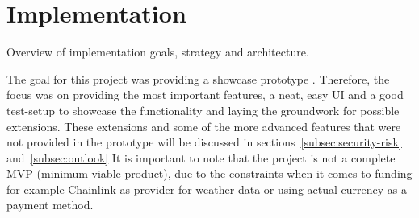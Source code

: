 \documentclass[11pt,a4paper]{article}
\begin{document}
    \section{Implementation}\label{sec:implementation}
    Overview of implementation goals, strategy and architecture.

    The goal for this project was providing a showcase prototype .
    Therefore, the focus was on providing the most important features, a neat, easy UI and a good test-setup to showcase the functionality and laying the groundwork for possible extensions.
    These extensions and some of the more advanced features that were not provided in the prototype will be discussed in sections~\ref{subsec:security-risk} and~\ref{subsec:outlook}
    It is important to note that the project is not a complete MVP (minimum viable product), due to the constraints when it comes to funding for example Chainlink as provider for weather data or using actual currency as a payment method.

\end{document}
